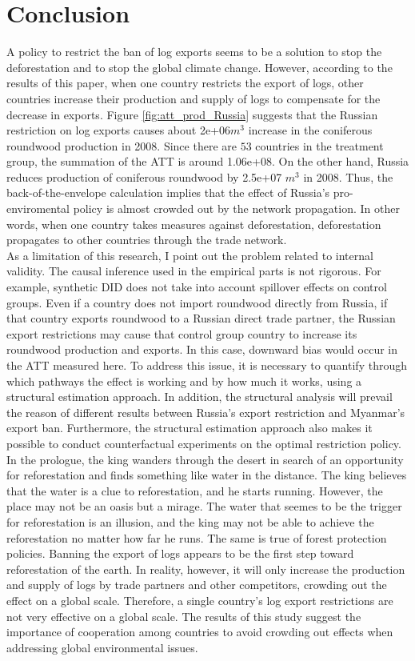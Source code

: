\documentclass[a4paper,12pt]{article}
\begin{document}
\section{Conclusion}
A policy to restrict the ban of log exports seems to be a solution to stop the deforestation and to stop the global climate change. However, according to the results of this paper, when one country restricts the export of logs, other countries increase their production and supply of logs to compensate for the decrease in exports. Figure \ref{fig:att_prod_Russia} suggests that the Russian restriction on log exports causes about 2e+06$m^3$ increase in the coniferous roundwood production in 2008. Since there are $53$ countries in the treatment group, the summation of the ATT is around 1.06e+08. On the other hand, Russia reduces production of coniferous roundwood by 2.5e+07 $m^3$ in 2008. Thus, the back-of-the-envelope calculation implies that the effect of Russia's pro-enviromental policy is almost crowded out by the network propagation. In other words, when one country takes measures against deforestation, deforestation propagates to other countries through the trade network. \\

As a limitation of this research, I point out the problem related to internal validity. The causal inference used in the empirical parts is not rigorous. For example, synthetic DID does not take into account spillover effects on control groups. Even if a country does not import roundwood directly from Russia, if that country exports roundwood to a Russian direct trade partner, the Russian export restrictions may cause that control group country to increase its roundwood production and exports. In this case, downward bias would occur in the ATT measured here. To address this issue, it is necessary to quantify through which pathways the effect is working and by how much it works, using a structural estimation approach. In addition, the structural analysis will prevail the reason of different results between Russia's export restriction and Myanmar's export ban. Furthermore, the structural estimation approach also makes it possible to conduct counterfactual experiments on the optimal restriction policy.\\

In the prologue, the king wanders through the desert in search of an opportunity for reforestation and finds something like water in the distance. The king believes that the water is a clue to reforestation, and he starts running. However, the place may not be an oasis but a mirage. The water that seemes to be the trigger for reforestation is an illusion, and the king may not be able to achieve the reforestation no matter how far he runs. The same is true of forest protection policies. Banning the export of logs appears to be the first step toward reforestation of the earth. In reality, however, it will only increase the production and supply of logs by trade partners and other competitors, crowding out the effect on a global scale. Therefore, a single country's log export restrictions are not very effective on a global scale. The results of this study suggest the importance of cooperation among countries to avoid crowding out effects when addressing global environmental issues.
\end{document}
